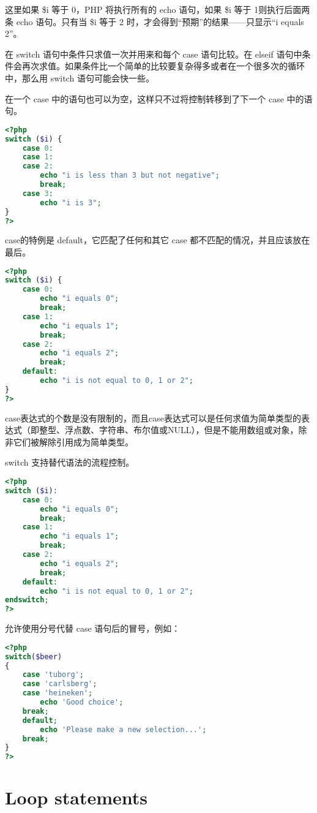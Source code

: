 这里如果 \$i 等于 0，PHP 将执行所有的 echo 语句，如果 \$i 等于 1则执行后面两条 echo 语句。只有当 \$i 等于 2 时，才会得到“预期”的结果——只显示“i equals 2”。

在 switch 语句中条件只求值一次并用来和每个 case 语句比较。在 elseif 语句中条件会再次求值。如果条件比一个简单的比较要复杂得多或者在一个很多次的循环中，那么用 switch 语句可能会快一些。

在一个 case 中的语句也可以为空，这样只不过将控制转移到了下一个 case 中的语句。

\begin{lstlisting}[language=PHP]
<?php
switch ($i) {
    case 0:
    case 1:
    case 2:
        echo "i is less than 3 but not negative";
        break;
    case 3:
        echo "i is 3";
}
?>
\end{lstlisting}


case的特例是 default，它匹配了任何和其它 case 都不匹配的情况，并且应该放在最后。

\begin{lstlisting}[language=PHP]
<?php
switch ($i) {
    case 0:
        echo "i equals 0";
        break;
    case 1:
        echo "i equals 1";
        break;
    case 2:
        echo "i equals 2";
        break;
    default:
        echo "i is not equal to 0, 1 or 2";
}
?>
\end{lstlisting}

case表达式的个数是没有限制的，而且case表达式可以是任何求值为简单类型的表达式（即整型、浮点数、字符串、布尔值或NULL），但是不能用数组或对象，除非它们被解除引用成为简单类型。

switch 支持替代语法的流程控制。

\begin{lstlisting}[language=PHP]
<?php
switch ($i):
    case 0:
        echo "i equals 0";
        break;
    case 1:
        echo "i equals 1";
        break;
    case 2:
        echo "i equals 2";
        break;
    default:
        echo "i is not equal to 0, 1 or 2";
endswitch;
?>
\end{lstlisting}


允许使用分号代替 case 语句后的冒号，例如：

\begin{lstlisting}[language=PHP]
<?php
switch($beer)
{
    case 'tuborg';
    case 'carlsberg';
    case 'heineken';
        echo 'Good choice';
    break;
    default;
        echo 'Please make a new selection...';
    break;
}
?>
\end{lstlisting}

\section{Loop statements}



